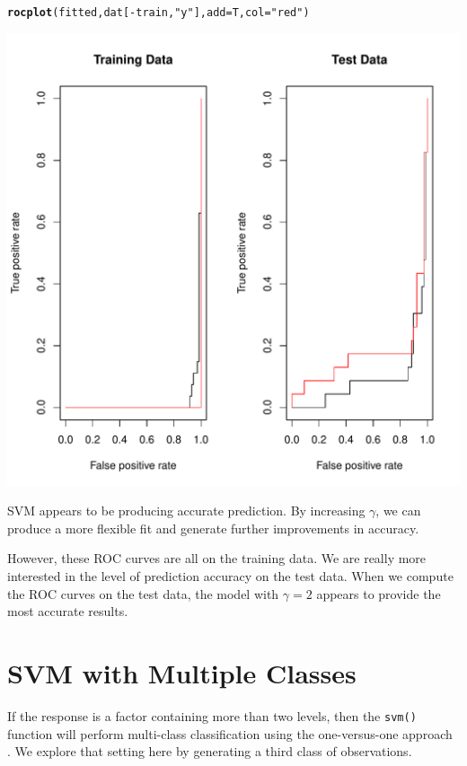 \documentclass[12pt]{article}\usepackage[]{graphicx}\usepackage[]{color}
\makeatletter
\def\maxwidth{ %
  \ifdim\Gin@nat@width>\linewidth
    \linewidth
  \else
    \Gin@nat@width
  \fi
}
\newcommand{\hlstr}[1]{\textcolor[rgb]{0.192,0.494,0.8}{#1}}%
\newcommand{\hlopt}[1]{\textcolor[rgb]{0,0,0}{#1}}%
\newcommand{\hlstd}[1]{\textcolor[rgb]{0.345,0.345,0.345}{#1}}%
\newcommand{\hlkwc}[1]{\textcolor[rgb]{0.333,0.667,0.333}{#1}}%
\newcommand{\hlkwd}[1]{\textcolor[rgb]{0.737,0.353,0.396}{\textbf{#1}}}%
\newenvironment{kframe}{%
 \def\at@end@of@kframe{}%
 \ifinner\ifhmode%
  \def\at@end@of@kframe{\end{minipage}}%
  \begin{minipage}{\columnwidth}%
 \fi\fi%
 \def\FrameCommand##1{\hskip\@totalleftmargin \hskip-\fboxsep
 \colorbox{shadecolor}{##1}\hskip-\fboxsep
     \hskip-\linewidth \hskip-\@totalleftmargin \hskip\columnwidth}%
 \MakeFramed {\advance\hsize-\width
   \@totalleftmargin\z@ \linewidth\hsize
   \@setminipage}}%
 {\par\unskip\endMakeFramed%
 \at@end@of@kframe}
\newenvironment{knitrout}{}{} %
\makeatother
\begin{document}
\begin{knitrout}
\begin{kframe}
\begin{alltt}
\hlkwd{rocplot}\hlstd{(fitted, dat[}\hlopt{-}\hlstd{train,}\hlstr{"y"}\hlstd{],} \hlkwc{add}\hlstd{=T,} \hlkwc{col}\hlstd{=}\hlstr{"red"}\hlstd{)}
\end{alltt}
\end{kframe}
\includegraphics[width=\maxwidth]{figure/unnamed-chunk-26-1} 

\end{knitrout}

SVM appears to be producing accurate prediction. By increasing $\gamma$, we can produce a more flexible fit and generate further improvements in accuracy.

However, these ROC curves are all on the training data. We are really more interested in the level of prediction accuracy on the test data. When we compute the ROC curves on the test data, the model with $\gamma=2$ appears to provide the most accurate results.

\newpage
\section{SVM with Multiple Classes}

If the response is a factor containing more than two levels, then the \texttt{svm()} function will perform multi-class classification using the one-versus-one approach . We explore that setting here by generating a third class of observations.
\end{document}

